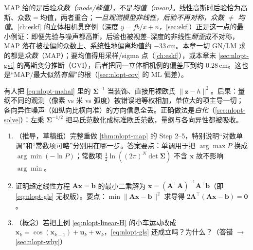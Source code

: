 \begin{pitfall}
MAP 给的是后验\emph{众数（mode/峰值）}，不是\emph{均值（mean）}。线性高斯时后验恰为高斯、众数$=$均值，两者重合；\emph{一旦观测模型非线性，后验不再对称，众数 $\neq$ 均值}\cite{barfoot2024state}。\cref{ch:eskf} 的立体相机贯穿例（深度 $y=fb/x+n$，\cref{sec:ekf}）正是这一点的最小例证：即便先验与噪声都高斯，后验也被视差–深度的非线性\emph{掰歪}成不对称，MAP 落在被拉偏的众数上、系统性地偏离均值约 $-33$\,cm。本章一切 GN/LM 求的都是\emph{众数}（MAP）；要均值得用采样/sigma 点（\cref{ch:eskf}），或本章末 \cref{sec:nlopt-gvi} 的高斯变分推断（GVI），后者把同一立体相机例的偏差压到约 $0.28$\,cm。这也是“MAP/最大似然\emph{有偏}”的根（\cref{sec:nlopt-cov} 的 ML 偏差）。
\end{pitfall}

\begin{pitfall}
有人把 \cref{eq:nlopt-mahal} 里的 $\boldsymbol{\Sigma}^{-1}$ 当装饰、直接用裸欧氏 $\|\mathbf{z}-h\|^2$。后果：量纲不同的观测（像素 vs 米 vs 弧度）被错误地等权相加，单位大的项主导一切；各向异性噪声（如纵向比横向准）的方向信息全丢。正确做法是\emph{白化}（\cref{sec:nlopt-solve}）：左乘 $\boldsymbol{\Sigma}^{-1/2}$ 把马氏范数化成标准欧氏范数，量纲与各向异性都被吸收。
\end{pitfall}

\begin{practice}
\begin{enumerate}
  \item （推导，草稿纸）完整重做 \cref{thm:nlopt-map} 的 Step 2--5，特别说明“对数单调”和“常数项可略”分别用在哪一步。答案要点：单调用于把 $\arg\max P$ 换成 $\arg\min(-\ln P)$；常数项 $\tfrac12\ln((2\pi)^N\det\boldsymbol{\Sigma})$ 不含 $\mathbf{x}$ 故不影响 $\arg\min$。
  \item 证明超定线性方程 $\mathbf{A}\mathbf{x}=\mathbf{b}$ 的最小二乘解为 $\mathbf{x}=(\mathbf{A}^\top\mathbf{A})^{-1}\mathbf{A}^\top\mathbf{b}$（即 \cref{eq:nlopt-gls} 无权版）。要点：$\min\|\mathbf{A}\mathbf{x}-\mathbf{b}\|^2$ 求导得 $2\mathbf{A}^\top(\mathbf{A}\mathbf{x}-\mathbf{b})=\mathbf{0}$。
  \item （概念）若把上例 \cref{eq:nlopt-linear-H} 的小车运动改成 $\mathbf{x}_k=\cos(\mathbf{x}_{k-1})+\mathbf{u}_k+\mathbf{w}_k$，\cref{eq:nlopt-gls} 还成立吗？为什么？（答错 $\to$ \cref{sec:nlopt-why}）
\end{enumerate}
\end{practice}

